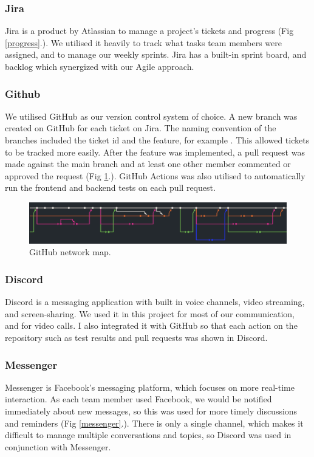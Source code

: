 \documentclass[conference]{IEEEtran}
\begin{document}
\subsubsection{Jira}
Jira is a product by Atlassian to manage a project's tickets and progress (Fig \ref{progress}.). We utilised it heavily to track what tasks team members were assigned, and to manage our weekly sprints. Jira has a built-in sprint board, and backlog which synergized with our Agile approach.

\subsubsection{Github}
We utilised GitHub as our version control system of choice. A new branch was created on GitHub for each ticket on Jira. The naming convention of the branches included the ticket id and the feature, for example . This allowed tickets to be tracked more easily. After the feature was implemented, a pull request was made against the main branch and at least one other member commented or approved the request (Fig \ref{github}.). GitHub Actions was also utilised to automatically run the frontend and backend tests on each pull request. 

\begin{figure}[htbp]
\centerline{\includegraphics[width = \linewidth]{github-network.png}}
\caption{GitHub network map.}
\label{github}
\end{figure}

\subsubsection{Discord}
Discord is a messaging application with built in voice channels, video streaming, and screen-sharing. We used it in this project for most of our communication, and for video calls. I also integrated it with GitHub so that each action on the repository such as test results and pull requests was shown in Discord.

\subsubsection{Messenger}
Messenger is Facebook's messaging platform, which focuses on more real-time interaction. As each team member used Facebook, we would be notified immediately about new messages, so this was used for more timely discussions and reminders (Fig \ref{messenger}.). There is only a single channel, which makes it difficult to manage multiple conversations and topics, so Discord was used in conjunction with Messenger.
\end{document}
